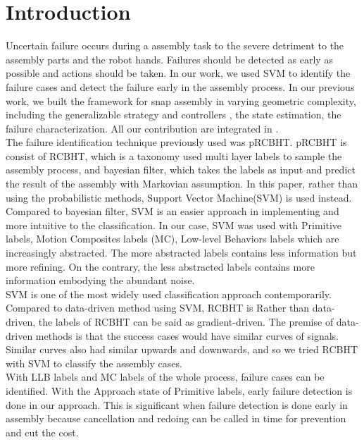 %

\chapter{Introduction}

Uncertain failure occurs during a assembly task to the severe detriment to the assembly parts and the robot hands. Failures should be detected as early as possible and actions should be taken. In our work, we used SVM to identify the failure cases and detect the failure early in the assembly process.
\indent In our previous work, we built the framework for snap assembly in varying geometric complexity, including the generalizable strategy and controllers\cite{2012JAR-Rojas-AutHetBotAsmbly} \cite{2012ICMA-Rojas-PivotApproach}, the state estimation\cite{2012IROS-Rojas-RCBHT}, the failure characterization\cite{2012Humanoids-Rojas-pRCBHT}. All our contribution are integrated in \cite{2013IJMA-Rojas-TwrdsSnapSensing}. \\
\indent The failure identification technique previously used was pRCBHT\cite{2013IJMA-Rojas-TwrdsSnapSensing}. pRCBHT is consist of RCBHT, which is a taxonomy used multi layer labels to sample the assembly process, and bayesian filter, which takes the labels as input and predict the result of the assembly with Markovian assumption. In this paper, rather than using the probabilistic methods, Support Vector Machine(SVM) is used instead. Compared to bayesian filter, SVM is an easier approach in implementing and more intuitive to the classification. In our case, SVM was used with Primitive labels, Motion Composites labels (MC), Low-level Behaviors labels which are increasingly abstracted. The more abstracted labels contains less information but more refining. On the contrary, the less abstracted labels contains more information embodying the abundant noise. \\
\indent SVM is one of the most widely used classification approach contemporarily. Compared to data-driven method using SVM\cite{masonfailure}, RCBHT is Rather than data-driven, the labels of RCBHT can be said as gradient-driven. The premise of data-driven methods is that the success cases would have similar curves of signals. Similar curves also had similar upwards and downwards, and so we tried RCBHT with SVM to classify the assembly cases. \\
\indent With LLB labels and MC labels of the whole process, failure cases can be identified. With the Approach state of Primitive labels, early failure detection is done in our approach. This is significant when failure detection is done early in assembly because cancellation and redoing can be called in time for prevention and cut the cost.\\
